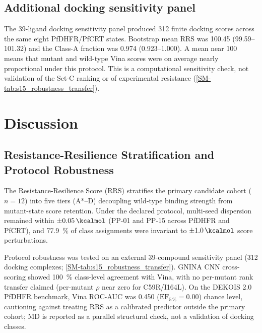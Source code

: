 \documentclass[journal=jcisd8,manuscript=article,layout=traditional]{achemso}
\begin{document}
\subsection{Additional docking sensitivity panel}

The 39-ligand docking sensitivity panel produced \num{312} finite docking scores across the same eight PfDHFR/PfCRT states. Bootstrap mean RRS was \num{100.45} (\numrange{99.59}{101.32}) and the Class-A fraction was \num{0.974} (\numrange{0.923}{1.000}). A mean near \num{100} means that mutant and wild-type Vina scores were on average nearly proportional under this protocol. This is a computational sensitivity check, not validation of the Set-C ranking or of experimental resistance (\cref{SM-tab:s15_robustness_transfer}).


\section{Discussion}

\subsection{Resistance-Resilience Stratification and Protocol Robustness}

The Resistance-Resilience Score (RRS) stratifies the primary candidate cohort ($n=\num{12}$) into five tiers (A*--D) decoupling wild-type binding strength from mutant-state score retention. Under the declared protocol, multi-seed dispersion remained within $\pm\qty{0.05}{\kcalmol}$ (PP-01 and PP-15 across PfDHFR and PfCRT), and \qty{77.9}{\percent} of class assignments were invariant to $\pm\qty{1.0}{\kcalmol}$ score perturbations.

Protocol robustness was tested on an external 39-compound sensitivity panel (\num{312} docking complexes; \cref{SM-tab:s15_robustness_transfer}). GNINA CNN cross-scoring showed \qty{100}{\percent} class-level agreement with Vina, with no per-mutant rank transfer claimed (per-mutant $\rho$ near zero for C59R/I164L). On the DEKOIS 2.0 PfDHFR benchmark, Vina ROC-AUC was \num{0.450} ($\mathrm{EF}_{5\,\%} = \num{0.00}$)  chance level, cautioning against treating RRS as a calibrated predictor outside the primary cohort; MD is reported as a parallel structural check, not a validation of docking classes.
\end{document}

